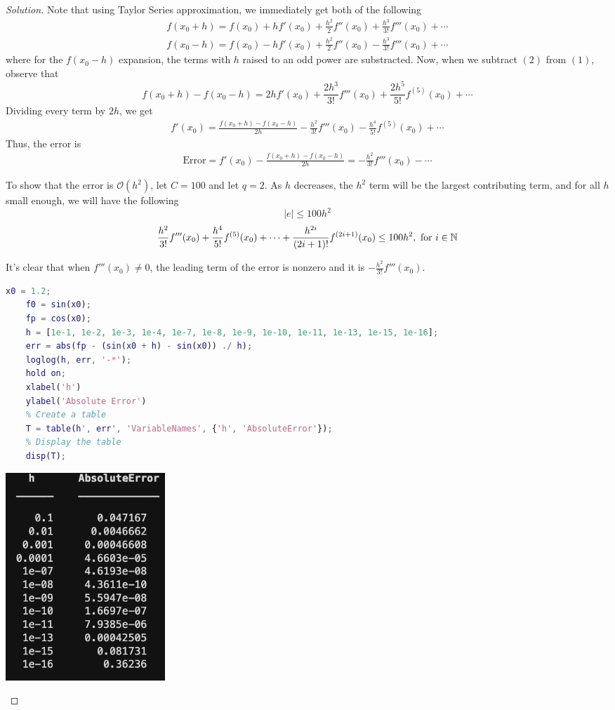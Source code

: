 \documentclass[12pt]{scrartcl}
\begin{document}
\begin{proof}[Solution]

  Note that using Taylor Series approximation, we immediately get both of the following 
  \begin{align}
    f(x_0 + h) = f(x_0) + hf'(x_0) + \frac{h^2}{2}f''(x_0) + \frac{h^3}{3!}f'''(x_0) + \cdots\\
    f(x_0 - h) = f(x_0) - hf'(x_0) + \frac{h^2}{2}f''(x_0) - \frac{h^3}{3!}f'''(x_0) + \cdots
  \end{align}
  where for the $f(x_0 - h)$ expansion, the terms with $h$ raised to an odd power are substracted.
  Now, when we subtract $(2)$ from $(1)$, observe that 
  \[f(x_0 + h) - f(x_0 - h) = 2hf'(x_0) + \frac{2h^3}{3!}f'''(x_0) + \frac{2h^5}{5!}f^{(5)}(x_0) + \cdots\]
  Dividing every term by $2h$, we get
  \begin{align}
    f'(x_0) = \frac{f(x_0 + h) - f(x_0 - h)}{2h} - \frac{h^2}{3!}f'''(x_0) - \frac{h^4}{5!}f^{(5)}(x_0) + \cdots
  \end{align}
  Thus, the error is 
  \begin{align}
    \text{Error} = f'(x_0) - \frac{f(x_0 + h) - f(x_0 - h)}{2h} = -\frac{h^2}{3!}f'''(x_0) - \cdots
  \end{align}

  To show that the error is $\mathcal{O}(h^2)$, let $C = 100$ and let $q = 2$. As $h$ decreases, 
  the $h^2$ term will be the largest contributing term, and for all $h$ small enough, we will have the following
  \[|e| \leq 100h^2\]
  \[\frac{h^2}{3!}f'''(x_0) + \frac{h^4}{5!}f^{(5)}(x_0) + \cdots + \frac{h^{2i}}{(2i + 1)!}f^{(2i + 1)}(x_0)\leq 100h^2, \text{ for } i \in \mathbb N\]

  It's clear that when $f'''(x_0) \neq 0$, the leading term of the error is nonzero and it is $-\frac{h^2}{3!}f'''(x_0)$.

  \begin{lstlisting}[language=Matlab]
    x0 = 1.2;
    f0 = sin(x0);
    fp = cos(x0);
    h = [1e-1, 1e-2, 1e-3, 1e-4, 1e-7, 1e-8, 1e-9, 1e-10, 1e-11, 1e-13, 1e-15, 1e-16];
    err = abs(fp - (sin(x0 + h) - sin(x0)) ./ h);
    loglog(h, err, '-*');
    hold on;
    xlabel('h')
    ylabel('Absolute Error')
    % Create a table
    T = table(h', err', 'VariableNames', {'h', 'AbsoluteError'});
    % Display the table
    disp(T);
  \end{lstlisting}

  \begin{center}
    \includegraphics[width=6cm]{table.png}
  \end{center}
\end{proof}
\end{document}
